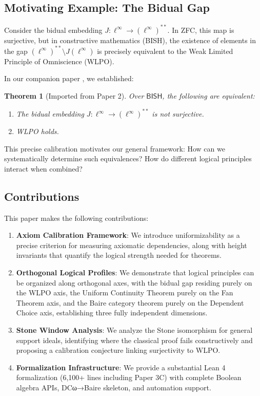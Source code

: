 \documentclass[11pt]{article}
\newtheorem{theorem}{Theorem}[section]
\newcommand{\BISH}{\mathsf{BISH}}
\newcommand{\linf}{\ell^\infty}
\begin{document}
\subsection{Motivating Example: The Bidual Gap}

Consider the bidual embedding $J: \linf \to (\linf)^{**}$. In ZFC, this map is surjective, but in constructive mathematics (BISH), the existence of elements in the gap $(\linf)^{**} \setminus J(\linf)$ is precisely equivalent to the Weak Limited Principle of Omniscience (WLPO).

In our companion paper \cite{Paper2}, we established:

\begin{theorem}[Imported from Paper 2]\label{thm:paper2}
Over $\BISH$, the following are equivalent:
\begin{enumerate}
\item The bidual embedding $J: \linf \to (\linf)^{**}$ is not surjective.
\item WLPO holds.
\end{enumerate}
\end{theorem}

This precise calibration motivates our general framework: How can we systematically determine such equivalences? How do different logical principles interact when combined?

\subsection{Contributions}

This paper makes the following contributions:

\begin{enumerate}
\item \textbf{Axiom Calibration Framework}: We introduce uniformizability as a precise criterion for measuring axiomatic dependencies, along with height invariants that quantify the logical strength needed for theorems.

\item \textbf{Orthogonal Logical Profiles}: We demonstrate that logical principles can be organized along orthogonal axes, with the bidual gap residing purely on the WLPO axis, the Uniform Continuity Theorem purely on the Fan Theorem axis, and the Baire category theorem purely on the Dependent Choice axis, establishing three fully independent dimensions.

\item \textbf{Stone Window Analysis}: We analyze the Stone isomorphism for general support ideals, identifying where the classical proof fails constructively and proposing a calibration conjecture linking surjectivity to WLPO.

\item \textbf{Formalization Infrastructure}: We provide a substantial Lean 4 formalization (6,100+ lines including Paper 3C) with complete Boolean algebra APIs, DCω→Baire skeleton, and automation support.
\end{enumerate}
\end{document}
